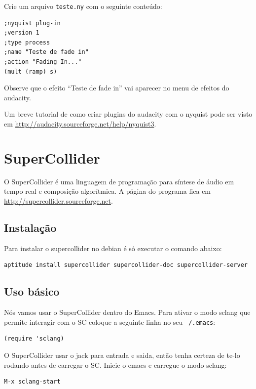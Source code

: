 \documentclass[12pt,brazil]{book}
\begin{document}
Crie um arquivo \texttt{teste.ny} com o seguinte conteúdo:

\begin{verbatim}
;nyquist plug-in
;version 1
;type process
;name "Teste de fade in"
;action "Fading In..."
(mult (ramp) s)
\end{verbatim}

Observe que o efeito ``Teste de fade in'' vai aparecer no menu de
efeitos do audacity.

Um breve tutorial de como criar plugins do audacity com o nyquist pode
ser visto em \url{http://audacity.sourceforge.net/help/nyquist3}.

\chapter{SuperCollider}
\label{cha:supercollider}

O SuperCollider é uma linguagem de programação para síntese de áudio
em tempo real e composição algorítmica. A página do programa fica em
\url{http://supercollider.sourceforge.net}.

\section{Instalação}
\label{sec:instalacao-2}

Para instalar o supercollider no debian é só executar o comando
abaixo:

\begin{verbatim}
aptitude install supercollider supercollider-doc supercollider-server
\end{verbatim}

\section{Uso básico}
\label{sec:uso-basico-1}

Nós vamos usar o SuperCollider dentro do Emacs. Para ativar o modo
sclang que permite interagir com o SC coloque a seguinte linha no seu
\texttt{~/.emacs}:

\begin{verbatim}
(require 'sclang)
\end{verbatim}

O SuperCollider usar o jack para entrada e saida, então tenha certeza
de te-lo rodando antes de carregar o SC. Inicie o emacs e carregue o
modo sclang:

\begin{verbatim}
M-x sclang-start
\end{verbatim}
\end{document}
